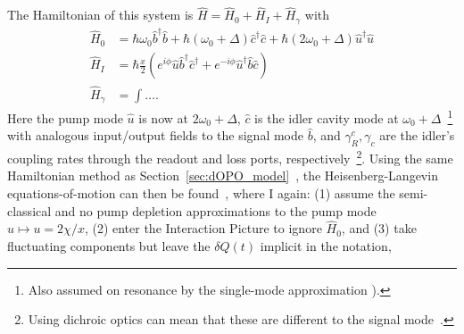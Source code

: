 The Hamiltonian of this system is $\hat H = \hat H_0+\hat H_I+\hat H_\gamma$ with~\cite{} 
\begin{align}
\hat H_0 &= \hbar \omega_0 \hat b^\dag \hat b + \hbar (\omega_0+\Delta) \hat c^\dag \hat c + \hbar (2\omega_0+\Delta) \hat u^\dag \hat u\\
\hat H_I &= \hbar \frac{x}{2} \left(e^{i\phi} \hat u \hat b^\dag \hat c^\dag + e^{-i\phi} \hat u^\dag \hat b \hat c \right)\\
\hat H_\gamma &= \int \ldots .
\end{align}
Here the pump mode $\hat u$ is now at $2\omega_0+\Delta$, $\hat c$ is the idler cavity mode at $\omega_0+\Delta$~\footnote{Also assumed on resonance by the single-mode approximation ).} with analogous input/output fields to the signal mode $\hat b$,
and $\gamma^c_R,\gamma_c$ are the idler's coupling rates through the readout and loss ports, respectively~\footnote{Using dichroic optics can mean that these are different to the signal mode~\cite{}.}. %
Using the same Hamiltonian method as Section~\ref{sec:dOPO_model}~\cite{}, the Heisenberg-Langevin equations-of-motion can then be found~\cite{}, where I again: (1) assume the semi-classical and no pump depletion approximations to the pump mode $\hat u\mapsto u=2\chi/x$, (2) enter the Interaction Picture to ignore $\hat H_0$, and (3) take fluctuating components but leave the $\delta \hat Q(t)$ implicit in the notation,

